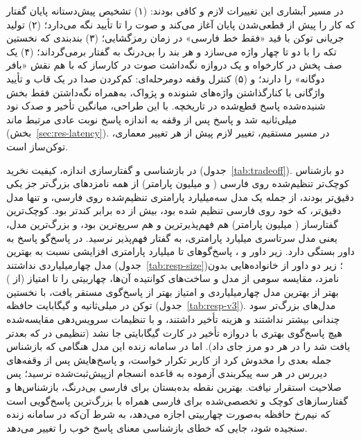 در مسیر آبشاری این تغییرات لازم و کافی بودند: (۱) تشخیص پیش‌دستانه پایان گفتار
که کار را پیش از قطعی‌شدن پایان آغاز می‌کند و صوت را تا تأیید نگه می‌دارد؛ (۲)
تولید جریانی توکن با قید «فقط خط فارسی» در زمان رمزگشایی؛ (۳) بندبندی که
نخستین تکه را با دو تا چهار واژه می‌سازد و هر بند را بی‌درنگ به گفتار
برمی‌گرداند؛ (۴) یک صف پخش در کارخواه و یک دروازه نگه‌داشت صوت در کارساز که
با هم نقش «بافر دوگانه» را دارند؛ و (۵) کنترل وقفه دومرحله‌ای: کم‌کردن صدا
در یک قاب و تأیید واژگانی با کنارگذاشتن واژه‌های شنونده و پژواک، به‌همراه
نگه‌داشتن فقط بخش شنیده‌شده پاسخ قطع‌شده در تاریخچه. با این طراحی، میانگین
تأخیر  و صدک نود  میلی‌ثانیه شد و پاسخ پس از وقفه به اندازه پاسخ
نوبت عادی مرتبط ماند (بخش~\ref{sec:res-latency}).
در مسیر مستقیم، تغییر لازم پیش از هر تغییر معماری، توکن‌ساز است.

 در بازشناسی و گفتارسازی اندازه،
کیفیت نخرید (جدول~\ref{tab:tradeoff}). دو بازشناس کوچک‌تر تنظیم‌شده روی فارسی
( و  میلیون پارامتر) از همه نامزدهای بزرگ‌تر جز یکی دقیق‌تر
بودند، از جمله یک مدل سه‌میلیارد پارامتری تنظیم‌شده روی فارسی، و تنها مدل
دقیق‌تر، که خود روی فارسی تنظیم شده بود، بیش از ده برابر کندتر بود.
کوچک‌ترین گفتارساز ( میلیون پارامتر) هم فهم‌پذیرترین و هم سریع‌ترین بود،
و بزرگ‌ترین مدل، یعنی مدل سرتاسری  میلیارد پارامتری، به گفتار فهم‌پذیر
نرسید. در پاسخ‌گو پاسخ به داور بستگی دارد. زیر داور  و ،
پاسخ‌گوهای  تا  میلیارد پارامتری افزایشی نسبت به بهترین مدل
چهارمیلیاردی نداشتند (جدول~\ref{tab:resp-size})؛ زیر دو داور از خانواده‌هایی بدون
نامزد، مقایسه سومی از  مدل و ساخت‌های کوانتیده آن‌ها، 
چهاربیتی را  تا  امتیاز (از ) بهتر از بهترین مدل
چهارمیلیاردی و  امتیاز بهتر از پاسخ‌گوی مستقر یافت، با نخستین توکن در
 میلی‌ثانیه و  گیگابایت حافظه (جدول~\ref{tab:resp-v3}). مدل‌های
بزرگ‌تر سود چندانی بیشتر نداشتند و هزینه تأخیر داشتند، و با تنظیمات سرویس‌دهی
مقایسه‌شده هیچ پاسخ‌گوی بهتری با دروازه تأخیر در کارت  گیگابایتی جا نشد
(تنظیمی در  که بعدتر یافت شد  را در هر دو مرز جای داد).
اما در سامانه زنده این مدل
هنگامی که بازشناس جمله بعدی را مخدوش کرد از کاربر تکرار خواست، و پاسخ‌هایش پس
از وقفه‌های دیررس در هر سه پیکربندی آزموده به قاعده انسجام ازپیش‌ثبت‌شده نرسید؛ پس
صلاحیت استقرار نیافت.
بهترین نقطه بده‌بستان برای فارسی بی‌درنگ، بازشناس‌ها و گفتارسازهای کوچک و
تخصصی‌شده برای فارسی همراه با بزرگ‌ترین پاسخ‌گویی است که نیم‌رخ حافظه به‌صورت
چهاربیتی اجازه می‌دهد، به شرط آن‌که در سامانه زنده سنجیده شود، جایی که خطای
بازشناسی معنای پاسخ خوب را تغییر می‌دهد.

